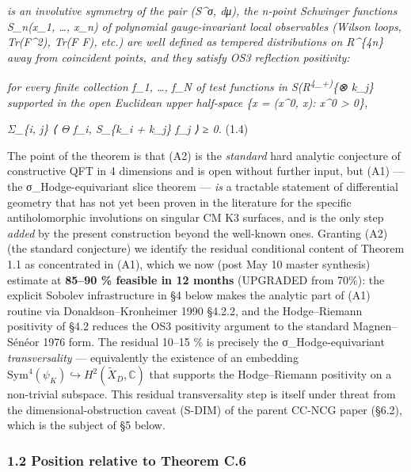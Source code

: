 \documentclass[
 11pt,
 a4paper,
]{article}
\begin{document}
\emph{is an involutive symmetry of the pair (S\^{}σ, dμ), the n-point Schwinger functions S\_n(x\_1, \ldots, x\_n) of polynomial gauge-invariant local observables (Wilson loops, Tr(F\^{}2), Tr(F F), etc.) are well defined as tempered distributions on R\^{}\{4n\} away from coincident points, and they satisfy OS3 reflection positivity:}

\emph{for every finite collection f\_1, \ldots, f\_N of test functions in S(R\textsuperscript{4\_+)}\{⊗ k\_j\} supported in the open Euclidean upper half-space \{x = (x\^{}0, x): x\^{}0 \textgreater{} 0\},}

\emph{Σ\_\{i, j\} ⟨ Θ f\_i, S\_\{k\_i + k\_j\} f\_j ⟩ ≥ 0.} (1.4)

The point of the theorem is that (A2) is the \emph{standard} hard analytic conjecture of constructive QFT in 4 dimensions and is open without further input, but (A1) --- the σ\_Hodge-equivariant slice theorem --- \emph{is} a tractable statement of differential geometry that has not yet been proven in the literature for the specific antiholomorphic involutions on singular CM K3 surfaces, and is the only step \emph{added} by the present construction beyond the well-known ones. Granting (A2) (the standard conjecture) we identify the residual conditional content of Theorem 1.1 as concentrated in (A1), which we now (post May 10 master synthesis) estimate at \textbf{85--90 \% feasible in 12 months} (UPGRADED from 70\%): the explicit Sobolev infrastructure in §4 below makes the analytic part of (A1) routine via Donaldson--Kronheimer 1990 §4.2.2, and the Hodge--Riemann positivity of §4.2 reduces the OS3 positivity argument to the standard Magnen--Sénéor 1976 form. The residual 10--15 \% is precisely the σ\_Hodge-equivariant \emph{transversality} --- equivalently the existence of an embedding \(\mathrm{Sym}^4(\psi_K) \hookrightarrow H^2(\widetilde{X}_D, \mathbb{C})\) that supports the Hodge--Riemann positivity on a non-trivial subspace. This residual transversality step is itself under threat from the dimensional-obstruction caveat (S-DIM) of the parent CC-NCG paper (§6.2), which is the subject of §5 below.

\hypertarget{position-relative-to-theorem-c.6}{%
\subsubsection{1.2 Position relative to Theorem C.6}\label{position-relative-to-theorem-c.6}}
\end{document}

